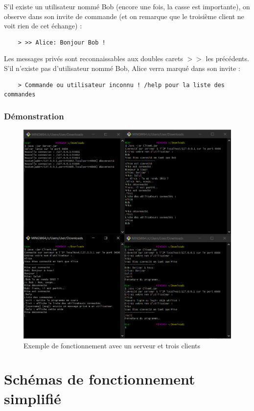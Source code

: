 \documentclass[10pt,a4paper]{article}
\begin{document}
	S'il existe un utilisateur nommé Bob (encore une fois, la casse est importante), on observe dans son invite de commande (et on remarque que le troisième client ne voit rien de cet échange) :
	
	\begin{verbatim}
	> >> Alice: Bonjour Bob !
	\end{verbatim}
	
	Les messages privés sont reconnaissables aux doubles carets $>>$ les précédents. S'il n'existe pas d'utilisateur nommé Bob, Alice verra marqué dans son invite :
	
	\begin{verbatim}
	> Commande ou utilisateur inconnu ! /help pour la liste des commandes
	\end{verbatim}
	
	\subsubsection{Démonstration}
	
	\begin{figure}[H]
	\includegraphics[width=\linewidth]{ressources/demo.png}
	\caption{Exemple de fonctionnement avec un serveur et trois clients}
	\end{figure}
	
	
	\section{Schémas de fonctionnement simplifié}
	
\end{document}
